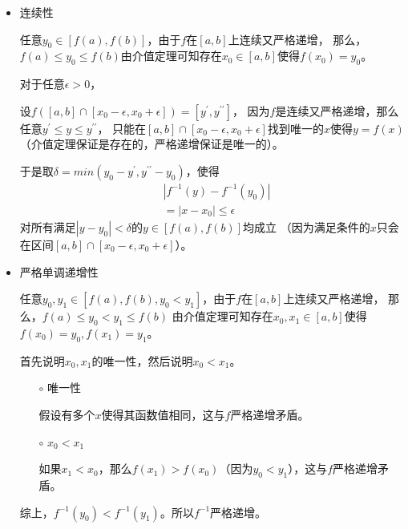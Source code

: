 \documentclass{article}
\begin{document}
\begin{itemize}
      \item 连续性

            任意$y_0 \in [f(a), f(b)]$，由于$f$在$[a, b]$上连续又严格递增，
            那么，$f(a) \leq y_0 \leq f(b)$由介值定理可知存在$x_0 \in [a, b]$使得$f(x_0) = y_0$。

            对于任意$\epsilon > 0$，

            设$f([a, b] \cap [x_0 - \epsilon, x_0 + \epsilon]) = [y^\prime, y^{\prime\prime}]$，
            因为$f$是连续又严格递增，那么任意$y^\prime \leq y \leq y^{\prime\prime}$，
            只能在$[a, b] \cap [x_0 - \epsilon, x_0 + \epsilon]$找到唯一的$x$使得$y = f(x)$
            （介值定理保证是存在的，严格递增保证是唯一的）。

            于是取$\delta = min(y_0 - y^\prime, y^{\prime\prime} - y_0)$，使得
            \begin{align*}
                   & |f^{-1}(y) - f^{-1}(y_0)| \\
                   & = |x - x_0| \leq \epsilon
            \end{align*}
            对所有满足$|y - y_0| < \delta$的$y \in [f(a),f(b)]$均成立
            （因为满足条件的$x$只会在区间$[a, b] \cap [x_0 - \epsilon, x_0 + \epsilon]$）。

      \item 严格单调递增性

            任意$y_0, y_1 \in [f(a), f(b), y_0 < y_1]$，由于$f$在$[a, b]$上连续又严格递增，
            那么，$f(a) \leq y_0 < y_1 \leq f(b)$
            由介值定理可知存在$x_0,x_1 \in [a, b]$使得$f(x_0) = y_0, f(x_1) = y_1$。

            首先说明$x_0, x_1$的唯一性，然后说明$x_0 < x_1$。

            \begin{itemize}
                  \item[$\circ$] 唯一性

                        假设有多个$x$使得其函数值相同，这与$f$严格递增矛盾。
                  \item[$\circ$] $x_0 < x_1$

                        如果$x_1 < x_0$，那么$f(x_1) > f(x_0)$（因为$y_0 < y_1$），这与$f$严格递增矛盾。
            \end{itemize}

            综上，$f^{-1}(y_0) < f^{-1}(y_1)$。所以$f^{-1}$严格递增。
\end{itemize}
\end{document}
